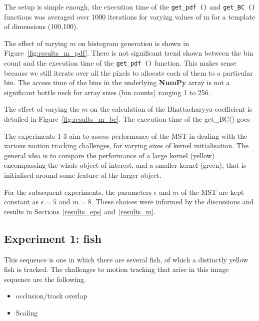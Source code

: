 The setup is simple enough, the execution time of the \lstinline{get_pdf ()} and
\lstinline{get_BC ()} functions was averaged over 1000 iterations for varying
values of m for a template of dimensions (100,100).

The effect of varying $m$ on histogram generation is shown in
Figure~\ref{fig:results_m_pdf}. There is not significant trend shown between the
bin count and the execution time of the \lstinline{get_pdf ()} function. This makes sense
because we still iterate over all the pixels to allocate each of them to a
particular bin. The access time of the bins in the underlying \textbf{NumPy} array is not
a significant bottle neck for array sizes (bin counts) ranging 1 to 256.

The effect of varying the $m$ on the calculation of the Bhattacharyya coefficient is
detailed in Figure~\ref{fig:results_m_bc}. The execution time of the get\_BC() goes  



The experiments 1-3 aim to assess performance of the MST in dealing with the
various motion tracking challenges, for varying sizes of kernel initialisation.
The general idea is to compare the performance of a large kernel (yellow)
encompassing the whole object of interest, and a smaller kernel (green), that is
initialised around some feature of the larger object. 

For the subsequent experiments, the parameters $\epsilon$ and $m$ of the MST are
kept constant as $\epsilon=5$ and $m=8$. These choices were informed by the
discussions and results in Sections~\ref{results_eps} and~\ref{results_m}. 

\subsection{Experiment 1: fish}
This sequence is one in which there are several fish, of which a distinctly yellow fish is
tracked. The challenges to motion tracking that arise in this image sequence are the following.
\begin{itemize}
    \item occlusion/track overlap
    \item Scaling 
\end{itemize}

